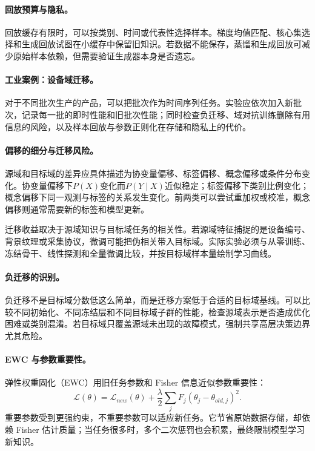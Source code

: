 \paragraph{回放预算与隐私。}
回放缓存有限时，可以按类别、时间或代表性选择样本。梯度均值匹配、核心集选择和生成回放试图在小缓存中保留旧知识。若数据不能保存，蒸馏和生成回放可减少原始样本依赖，但需要验证生成器本身是否遗忘。

\paragraph{工业案例：设备域迁移。}
对于不同批次生产的产品，可以把批次作为时间序列任务。实验应依次加入新批次，记录每一批的即时性能和旧批次性能；同时检查负迁移、域对抗训练删除有用信息的风险，以及样本回放与参数正则化在存储和隐私上的代价。

\paragraph{偏移的细分与迁移风险。}
源域和目标域的差异应具体描述为协变量偏移、标签偏移、概念偏移或条件分布变化。协变量偏移下$P(X)$变化而$P(Y\mid X)$近似稳定；标签偏移下类别比例变化；概念偏移下同一观测与标签的关系发生变化。前两类可以尝试重加权或校准，概念偏移则通常需要新的标签和模型更新。

迁移收益取决于源域知识与目标域任务的相关性。若源域特征捕捉的是设备编号、背景纹理或采集协议，微调可能把伪相关带入目标域。实际实验必须与从零训练、冻结骨干、线性探测和全量微调比较，并按目标域样本量绘制学习曲线。

\paragraph{负迁移的识别。}
负迁移不是目标域分数低这么简单，而是迁移方案低于合适的目标域基线。可以比较不同初始化、不同冻结层和不同目标域子群的性能，检查源域表示是否造成优化困难或类别混淆。若目标域只覆盖源域未出现的故障模式，强制共享高层决策边界尤其危险。

\paragraph{EWC 与参数重要性。}
弹性权重固化（EWC）用旧任务参数和 Fisher 信息近似参数重要性：
\begin{equation}
 \mathcal{L}(\theta)=\mathcal{L}_{new}(\theta)+\frac{\lambda}{2}\sum_jF_j(\theta_j-\theta_{old,j})^2.
\end{equation}
重要参数受到更强约束，不重要参数可以适应新任务。它节省原始数据存储，却依赖 Fisher 估计质量；当任务很多时，多个二次惩罚也会积累，最终限制模型学习新知识。


